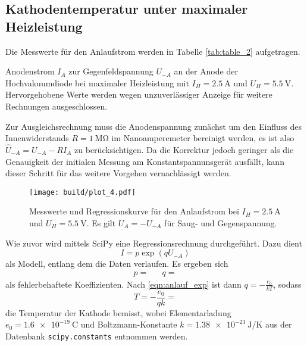 \newpage
\subsection{Kathodentemperatur unter maximaler Heizleistung}

Die Messwerte für den Anlaufstrom werden in Tabelle \ref{tab:table_2} aufgetragen. 

\begin{table}[H]
	\caption{Anodenstrom $I_A$ zur Gegenfeldspannung $U_{-A}$ an der Anode der Hochvakuumdiode bei maximaler Heizleistung mit
			 $I_H = \qty{2.5}{\ampere}$ und $U_H = \qty{5.5}{\volt}$. Hervorgehobene Werte werden wegen unzuverlässiger Anzeige
			 für weitere Rechnungen ausgeschlossen.}
	\centering
	
	\label{tab:table_2}
\end{table}

Zur Ausgleichsrechnung muss die Anodenspannung zunächst um den Einfluss des Innenwiderstands $R = \qty{1}{\mega\ohm}$ im
Nanoamperemeter bereinigt werden, es ist also $\hat U_{-A} = U_{-A} - RI_A$ zu berücksichtigen. Da die Korrektur jedoch
geringer als die Genauigkeit der initialen Messung am Konstantspannunsgerät ausfällt, kann dieser Schritt für das
weitere Vorgehen vernachlässigt werden.

\begin{figure}[H]
	\texttt{[image: build/plot\_4.pdf]}
	\caption{Messwerte und Regressionskurve für den Anlaufstrom bei $I_H = \qty{2.5}{\ampere}$ und $U_H = \qty{5.5}{\volt}$. Es gilt
			 $U_A = -U_{-A}$ für Saug- und Gegenspannung.}
	\label{fig:plot_4}
\end{figure}

Wie zuvor wird mittels SciPy \cite{scipy} eine Regressionsrechnung durchgeführt. Dazu dient
\begin{equation*}
	I = p \exp(q U_{-A})
\end{equation*}
als Modell, entlang dem die Daten verlaufen. Es ergeben sich
\begin{align*}
	p =  && q = 
\end{align*}
als fehlerbehaftete Koeffizienten. Nach \eqref{eqn:anlauf_exp} ist dann $q = -\frac{e_0}{kT}$, sodass
\begin{equation*}
	T = -\frac{e_0}{qk} = 
\end{equation*}
die Temperatur der Kathode bemisst, wobei Elementarladung $e_0 = \qty{1.6e-19}{\coulomb}$ und Boltzmann-Konstante
$k = \qty{1.38e-23}{\joule\per\kelvin}$ aus der Datenbank \verb+scipy.constants+ entnommen werden.


